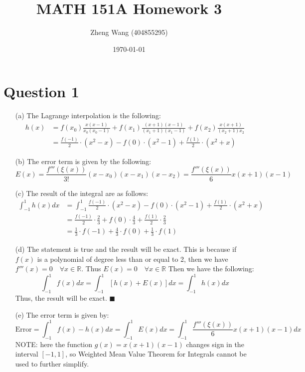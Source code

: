 \documentclass[11pt]{article}
\author{Zheng Wang (404855295)}
\date{\today}
\title{MATH 151A Homework 3}
\begin{document}
\maketitle


\section*{Question 1}
\begin{itemize}
	\item [(a)]
	The Lagrange interpolation is the following:
	\begin{equation*}
	\begin{aligned}
	h(x) &= f(x_0)\frac{x(x-1)}{x_0(x_0-1)} + f(x_1)\frac{(x+1)(x-1)}{(x_1+1)(x_1-1)} + f(x_2)\frac{x(x+1)}{(x_2+1)x_2}\\
	&=\frac{f(-1)}{2}\cdot (x^2-x) - f(0)\cdot (x^2-1) + \frac{f(1)}{2}\cdot (x^2+x)
	\end{aligned}
	\end{equation*}
	
	\item [(b)]
	The error term is given by the following:
	\[ E(x) = \frac{f'''(\xi(x))}{3!}(x-x_0)(x-x_1)(x-x_2) = \frac{f'''(\xi(x))}{6}x(x+1)(x-1)  \]
	
	\item [(c)]
	The result of the integral are as follows:
	\begin{equation*}
	\begin{aligned}
	\int_{-1}^{1}h(x) dx &= \int_{-1}^{1} \frac{f(-1)}{2}\cdot (x^2-x) - f(0)\cdot (x^2-1) + \frac{f(1)}{2}\cdot (x^2+x)\\
	&= \frac{f(-1)}{2}\cdot\frac{2}{3} + f(0)\cdot\frac{4}{3} + \frac{f(1)}{2}\cdot\frac{2}{3}\\
	&=\frac{1}{3}\cdot f(-1) + \frac{4}{3}\cdot f(0) + \frac{1}{3}\cdot f(1)
	\end{aligned}
	\end{equation*}
	
	\item[(d)]
	The statement is true and the result will be exact. This is because if $ f(x) $ is a polynomial of degree less than or equal to 2, then we have $ f'''(x)=0\quad \forall x\in \mathbb{R} $. Thus $ E(x) = 0 \quad \forall x \in \mathbb{R} $
	Then we have the following:
	\[ \int_{-1}^{1} f(x) dx = \int_{-1}^{1} [h(x) + E(x)] dx = \int_{-1}^{1} h(x) dx \]
	Thus, the result will be exact. \hfill $ \blacksquare $
	
	\item [(e)]
	The error term is given by:
	\[ \text{Error} = \int_{-1}^{1} f(x)-h(x) dx = \int_{-1}^{1} E(x) dx = \int_{-1}^{1} \frac{f'''(\xi(x))}{6}x(x+1)(x-1) dx \]
	NOTE: here the function $ g(x) = x(x+1)(x-1) $ changes sign in the interval $ [-1,1] $, so Weighted Mean Value Theorem for Integrals cannot be used to further simplify.\pagebreak
\end{itemize}
\end{document}
